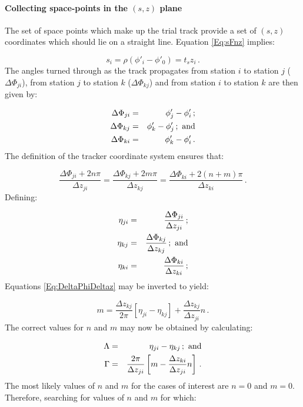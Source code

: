 \paragraph{Collecting space-points in the $(s, z)$ plane}

The set of space points which make up the trial track provide a set of $(s, z)$ coordinates which should lie on a straight line. Equation \ref{Eq:sFnz} implies:

\begin{equation}
  s_i = \rho ( \phi'_i - \phi'_0 ) = t_s z_i \, .
\end{equation}
The angles turned through as the track propagates from station $i$ to station $j$ ($\Delta \Phi_{ji}$), from station $j$ to station $k$ ($\Delta \Phi_{kj}$) and from station $i$ to station $k$ are then given by: 

\begin{eqnarray}
  \Delta \Phi_{ji} & = & \phi'_j - \phi'_i \, ;    \\
  \Delta \Phi_{kj} & = & \phi'_k - \phi'_j \, ; {\rm~and}  \\
  \Delta \Phi_{ki} & = & \phi'_k - \phi'_i \, .
\end{eqnarray}
The definition of the tracker coordinate system ensures that:

\begin{equation}
  \frac{\Delta \Phi_{ji} + 2 n \pi}{\Delta z_{ji}} = 
  \frac{\Delta \Phi_{kj} + 2 m \pi}{\Delta z_{kj}} = 
  \frac{\Delta \Phi_{ki} + 2 (n+m) \pi}{\Delta z_{ki}} \, .
  \label{Eq:DeltaPhiDeltaz}
\end{equation}
Defining:

\begin{eqnarray}
  \eta_{ji} & = & \frac{\Delta \Phi_{ji}}{\Delta z_{ji}} \, ;           \\
  \eta_{kj} & = & \frac{\Delta \Phi_{kj}}{\Delta z_{kj}} \, ; {\rm~and} \\
  \eta_{ki} & = & \frac{\Delta \Phi_{ki}}{\Delta z_{ki}} \, ;
\end{eqnarray}
Equations \ref{Eq:DeltaPhiDeltaz} may be inverted to yield:

\begin{equation}
  m = \frac{\Delta z_{kj}}{2 \pi} \left[ \eta_{ji} - \eta_{kj} \right] +
      \frac{\Delta z_{kj}}{\Delta z_{ji}} n \, .
\end{equation}
The correct values for $n$ and $m$ may now be obtained by calculating:

\begin{eqnarray}
  \Lambda   & = & \eta_{ji} - \eta_{kj} \, ;  {\rm~and} \\
  \Gamma & = & \frac{2 \pi}{\Delta z_{ji}} 
                 \left[
                   m - \frac{\Delta z_{ki}}{\Delta z_{ji}} n
                 \right] \, .
\end{eqnarray}
The most likely values of $n$ and $m$ for the cases of interest are $n=0$ and $m=0$.  Therefore, searching for values of $n$ and $m$ for which:

